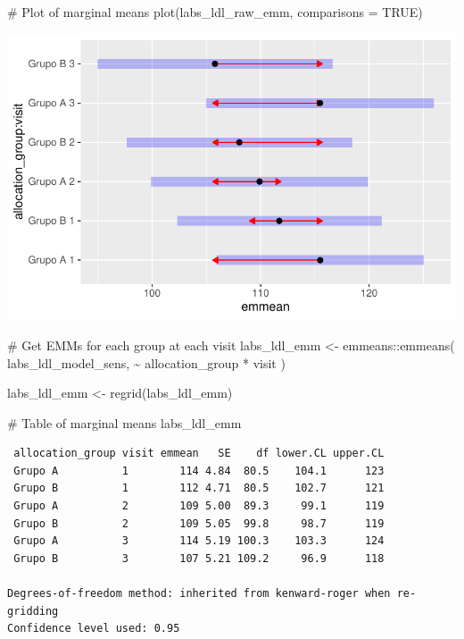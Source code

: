 \documentclass[
  letterpaper,
  DIV=11,
  numbers=noendperiod]{scrartcl}
\newenvironment{Shaded}{\begin{snugshade}}{\end{snugshade}}
\newcommand{\AttributeTok}[1]{\textcolor[rgb]{0.40,0.45,0.13}{#1}}
\newcommand{\CommentTok}[1]{\textcolor[rgb]{0.37,0.37,0.37}{#1}}
\newcommand{\ConstantTok}[1]{\textcolor[rgb]{0.56,0.35,0.01}{#1}}
\newcommand{\FunctionTok}[1]{\textcolor[rgb]{0.28,0.35,0.67}{#1}}
\newcommand{\NormalTok}[1]{\textcolor[rgb]{0.00,0.23,0.31}{#1}}
\newcommand{\OtherTok}[1]{\textcolor[rgb]{0.00,0.23,0.31}{#1}}
\newcommand{\SpecialCharTok}[1]{\textcolor[rgb]{0.37,0.37,0.37}{#1}}
\begin{document}
\begin{Shaded}
\begin{Highlighting}[]
\CommentTok{\# Plot of marginal means}
\FunctionTok{plot}\NormalTok{(labs\_ldl\_raw\_emm, }\AttributeTok{comparisons =} \ConstantTok{TRUE}\NormalTok{)}
\end{Highlighting}
\end{Shaded}

\includegraphics{Outcomes_V1V2V3_files/figure-pdf/labs_ldl_raw_emm-1.pdf}

\begin{Shaded}
\begin{Highlighting}[]
\CommentTok{\# Get EMMs for each group at each visit}
\NormalTok{labs\_ldl\_emm }\OtherTok{\textless{}{-}}\NormalTok{ emmeans}\SpecialCharTok{::}\FunctionTok{emmeans}\NormalTok{(}
\NormalTok{    labs\_ldl\_model\_sens, }
    \SpecialCharTok{\textasciitilde{}}\NormalTok{ allocation\_group }\SpecialCharTok{*}\NormalTok{ visit}
\NormalTok{)}

\NormalTok{labs\_ldl\_emm }\OtherTok{\textless{}{-}} \FunctionTok{regrid}\NormalTok{(labs\_ldl\_emm)}

\CommentTok{\# Table of marginal means}
\NormalTok{labs\_ldl\_emm}
\end{Highlighting}
\end{Shaded}

\begin{verbatim}
 allocation_group visit emmean   SE    df lower.CL upper.CL
 Grupo A          1        114 4.84  80.5    104.1      123
 Grupo B          1        112 4.71  80.5    102.7      121
 Grupo A          2        109 5.00  89.3     99.1      119
 Grupo B          2        109 5.05  99.8     98.7      119
 Grupo A          3        114 5.19 100.3    103.3      124
 Grupo B          3        107 5.21 109.2     96.9      118

Degrees-of-freedom method: inherited from kenward-roger when re-gridding 
Confidence level used: 0.95 
\end{verbatim}
\end{document}
